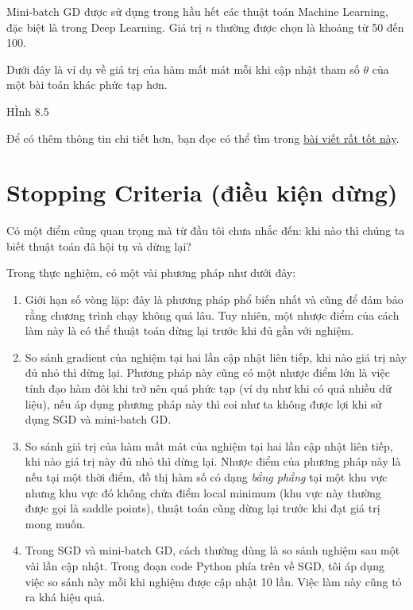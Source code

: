 Mini-batch GD được sử dụng trong hầu hết các thuật toán Machine Learning, đặc biệt là trong Deep Learning. Giá trị $n$ thường được chọn là khoảng từ 50 đến 100. 
 
Dưới đây là ví dụ về giá trị của hàm mất mát mỗi khi cập nhật tham số $\theta$ của một bài toán khác phức tạp hơn. 
 
{\color{red} HÌnh 8.5} 
 
Để có thêm thông tin chi tiết hơn, bạn đọc có thể tìm trong \href{http://sebastianruder.com/optimizing-gradient-descent/index.html#stochasticgradientdescent}{bài viết rất tốt này}.  
 
 
 
 
\section{Stopping Criteria (điều kiện dừng)}
 
Có một điểm cũng quan trọng mà từ đầu tôi chưa nhắc đến: khi nào thì chúng ta biết thuật toán đã hội tụ và dừng lại? 
 
Trong thực nghiệm, có một vài phương pháp như dưới đây: 
\begin{enumerate}

 \item  Giới hạn số vòng lặp: đây là phương pháp phổ biến nhất và cũng để đảm bảo rằng chương trình chạy không quá lâu. Tuy nhiên, một nhược điểm của cách làm này là có thể thuật toán dừng lại trước khi đủ gần với nghiệm.  

 \item  So sánh gradient của nghiệm tại hai lần cập nhật liên tiếp, khi nào giá trị này đủ nhỏ thì dừng lại. Phương pháp này cũng có một nhược điểm lớn là việc tính đạo hàm đôi khi trở nên quá phức tạp (ví dụ như khi có quá nhiều dữ liệu), nếu áp dụng phương pháp này thì coi như ta không được lợi khi sử dụng SGD và mini-batch GD.  

 \item  So sánh giá trị của hàm mất mát của nghiệm tại hai lần cập nhật liên tiếp, khi nào giá trị này đủ nhỏ thì dừng lại. Nhược điểm của phương pháp này là nếu tại một thời điểm, đồ thị hàm số có dạng \textit{bẳng phẳng} tại một khu vực nhưng khu vực đó không chứa điểm local minimum (khu vực này thường được gọi là saddle points), thuật toán cũng dừng lại trước khi đạt giá trị mong muốn.  

 \item  Trong SGD và mini-batch GD, cách thường dùng là so sánh nghiệm sau một vài lần cập nhật. Trong đoạn code Python phía trên về SGD, tôi áp dụng việc so sánh này mỗi khi nghiệm được cập nhật 10 lần. Việc làm này cũng tỏ ra khá hiệu quả.  
\end{enumerate}
 
